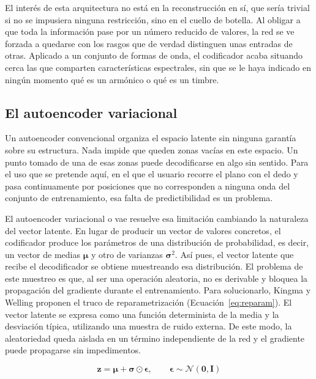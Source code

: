 El interés de esta arquitectura no está en la reconstrucción en sí, que sería
trivial si no se impusiera ninguna restricción, sino en el cuello de botella. Al
obligar a que toda la información pase por un número reducido de valores, la red
se ve forzada a quedarse con los rasgos que de verdad
distinguen unas entradas de otras. Aplicado a un conjunto de formas de onda, el
codificador acaba situando cerca las que comparten características espectrales,
sin que se le haya indicado en ningún momento qué es un armónico o qué es un timbre.

\subsection{El autoencoder variacional}

Un autoencoder convencional organiza el espacio latente sin ninguna garantía
sobre su estructura. Nada impide que queden zonas vacías en este espacio. 
Un punto tomado de una de esas zonas puede decodificarse en algo sin
sentido. Para el uso que se pretende aquí, en el que el usuario recorre el plano
con el dedo y pasa continuamente por posiciones que no corresponden a ninguna
onda del conjunto de entrenamiento, esa falta de predictibilidad es un problema.

El autoencoder variacional o \gls{vae} \cite{Kingma2013} resuelve esa limitación
cambiando la naturaleza del vector latente. En lugar de producir un vector de valores
concretos, el codificador produce los parámetros de una distribución de
probabilidad, es decir, un vector de medias $\boldsymbol{\mu}$ y otro de
varianzas $\boldsymbol{\sigma}^2$. Así pues, el vector latente que recibe el decodificador se
obtiene muestreando esa distribución. El problema de este muestreo es que, al ser
una operación aleatoria, no es derivable y bloquea la propagación del gradiente durante 
el entrenamiento. Para solucionarlo, Kingma y Welling proponen el truco de reparametrización 
(Ecuación~\eqref{eq:reparam}). El vector latente se expresa como una función 
determinista de la media y la desviación típica, utilizando una muestra de ruido 
externa. De este modo, la aleatoriedad queda aislada en un término independiente 
de la red y el gradiente puede propagarse sin impedimentos.

\begin{equation}
\label{eq:reparam}
\mathbf{z} = \boldsymbol{\mu} + \boldsymbol{\sigma} \odot \boldsymbol{\epsilon},
\qquad \boldsymbol{\epsilon} \sim \mathcal{N}(\mathbf{0}, \mathbf{I})
\end{equation}

